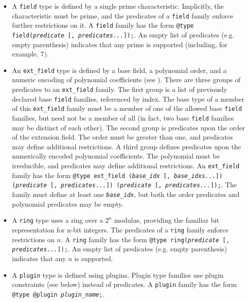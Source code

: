 \begin{itemize}
  \item A \texttt{field} type is defined by a single prime characteristic.
    Implicitly, the characteristic must be prime, and the predicates of a \texttt{field} family enforce further restrictions on it.
    A \texttt{field} family has the form \texttt{@type field(\textit{predicate} [, \textit{predicates...}]);}.
    An empty list of predicates (e.g. empty parenthesis) indicates that any prime is supported (including, for example, 7).
  \item An \texttt{ext\_field} type is defined by a base field, a polynomial order, and a numeric encoding of polynomial coefficients (see ).
    There are three groups of predicates to an \texttt{ext\_field} family.
    The first group is a list of previously declared base \texttt{field} families, referenced by index.
    The base type of a member of this \texttt{ext\_field} family must be a member of one of the allowed base \texttt{field} families, but need not be a member of all (in fact, two base \texttt{field} families may be distinct of each other).
    The second group is predicates upon the order of the extension field.
    The order must be greater than one, and predicates may define additional restrictions.
    A third group defines predicates upon the numerically encoded polynomial coefficients.
    The polynomial must be irreducible, and predicates may define additional restrictions.
    An \texttt{ext\_field} family has the form \texttt{@type ext\_field (\textit{base\_idx} [, \textit{base\_idxs...}]) (\textit{predicate} [, \textit{predicates...}]) (\textit{predicate} [, \textit{predicates...}]);}.
    The family must define at least one \texttt{\textit{base\_idx}}, but both the order predicates and polynomial predicates may be empty.
  \item A \texttt{ring} type uses a ring over a $2^n$ modulus, providing the familiar bit representation for n-bit integers.
    The predicates of a \texttt{ring} family enforce restrictions on $n$.
    A \texttt{ring} family has the form \texttt{@type ring(\textit{predicate} [, \textit{predicates...}]);}.
    An empty list of predicates (e.g. empty parenthesis) indicates that any $n$ is supported.
  \item A \texttt{plugin} type is defined using plugins. Plugin type families use plugin constraints (see below) instead of predicates.
    A \texttt{plugin} family has the form \texttt{@type @plugin \textit{plugin\_name};}.
\end{itemize}

